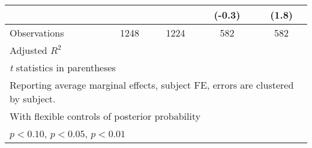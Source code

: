 \begin{table}[htbp]
\begin{tabular}{l*{4}{c}}
                &                  &                  &   (-0.3)         &    (1.8)         \\
\hline
Observations    &     1248         &     1224         &      582         &      582         \\
Adjusted \(R^{2}\)&                  &                  &                  &                  \\
\hline\hline
\multicolumn{5}{l}{\footnotesize \textit{t} statistics in parentheses}\\
\multicolumn{5}{l}{\footnotesize Reporting average marginal effects, subject FE, errors are clustered by subject.}\\
\multicolumn{5}{l}{\footnotesize With flexible controls of posterior probability}\\
\multicolumn{5}{l}{\footnotesize \sym{*} \(p<0.10\), \sym{**} \(p<0.05\), \sym{***} \(p<0.01\)}\\
\end{tabular}
\end{table}

